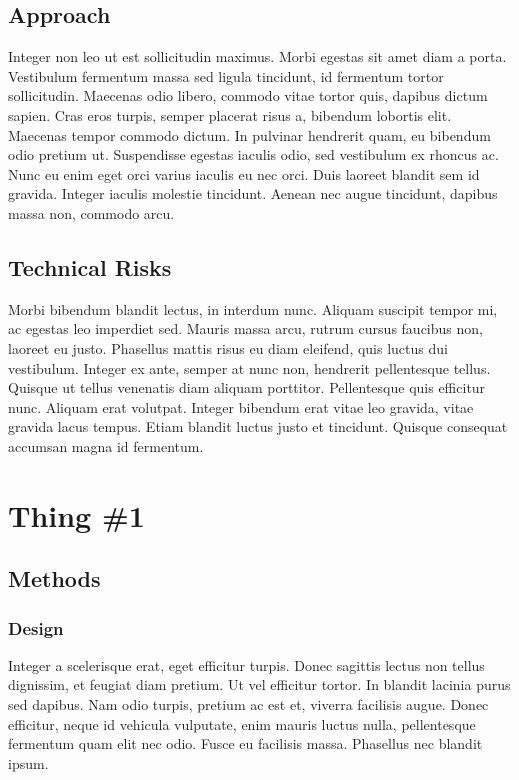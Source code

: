 \section{Approach}
Integer non leo ut est sollicitudin maximus. Morbi egestas sit amet diam a porta. Vestibulum fermentum massa sed ligula tincidunt, id fermentum tortor sollicitudin. Maecenas odio libero, commodo vitae tortor quis, dapibus dictum sapien. Cras eros turpis, semper placerat risus a, bibendum lobortis elit. Maecenas tempor commodo dictum. In pulvinar hendrerit quam, eu bibendum odio pretium ut. Suspendisse egestas iaculis odio, sed vestibulum ex rhoncus ac. Nunc eu enim eget orci varius iaculis eu nec orci. Duis laoreet blandit sem id gravida. Integer iaculis molestie tincidunt. Aenean nec augue tincidunt, dapibus massa non, commodo arcu.

\section{Technical Risks}
Morbi bibendum blandit lectus, in interdum nunc. Aliquam suscipit tempor mi, ac egestas leo imperdiet sed. Mauris massa arcu, rutrum cursus faucibus non, laoreet eu justo. Phasellus mattis risus eu diam eleifend, quis luctus dui vestibulum. Integer ex ante, semper at nunc non, hendrerit pellentesque tellus. Quisque ut tellus venenatis diam aliquam porttitor. Pellentesque quis efficitur nunc. Aliquam erat volutpat. Integer bibendum erat vitae leo gravida, vitae gravida lacus tempus. Etiam blandit luctus justo et tincidunt. Quisque consequat accumsan magna id fermentum.


\chapter{Thing \#1}

\section{Methods}

\subsection{Design}
Integer a scelerisque erat, eget efficitur turpis. Donec sagittis lectus non tellus dignissim, et feugiat diam pretium. Ut vel efficitur tortor. In blandit lacinia purus sed dapibus. Nam odio turpis, pretium ac est et, viverra facilisis augue. Donec efficitur, neque id vehicula vulputate, enim mauris luctus nulla, pellentesque fermentum quam elit nec odio. Fusce eu facilisis massa. Phasellus nec blandit ipsum.

